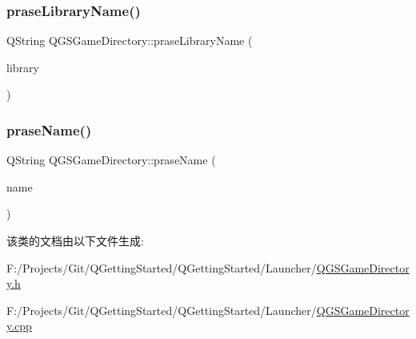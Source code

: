 \mbox{\label{class_q_g_s_game_directory_a862cadde0ec810cb444346fcf2f75da4}} 
\subsubsection{\texorpdfstring{prase\+Library\+Name()}{praseLibraryName()}}
{\footnotesize\ttfamily Q\+String Q\+G\+S\+Game\+Directory\+::prase\+Library\+Name (\begin{DoxyParamCaption}\item[{const \mbox{\hyperlink{class_q_g_s_library}{Q\+G\+S\+Library}} \&}]{library }\end{DoxyParamCaption})\hspace{0.3cm}{\ttfamily [static]}}

\mbox{\label{class_q_g_s_game_directory_a05d4f173c565e05d9f271a31ea6a82e6}} 
\subsubsection{\texorpdfstring{prase\+Name()}{praseName()}}
{\footnotesize\ttfamily Q\+String Q\+G\+S\+Game\+Directory\+::prase\+Name (\begin{DoxyParamCaption}\item[{const Q\+String \&}]{name }\end{DoxyParamCaption})\hspace{0.3cm}{\ttfamily [static]}}



该类的文档由以下文件生成\+:\begin{DoxyCompactItemize}
\item 
F\+:/\+Projects/\+Git/\+Q\+Getting\+Started/\+Q\+Getting\+Started/\+Launcher/\mbox{\hyperlink{_q_g_s_game_directory_8h}{Q\+G\+S\+Game\+Directory.\+h}}\item 
F\+:/\+Projects/\+Git/\+Q\+Getting\+Started/\+Q\+Getting\+Started/\+Launcher/\mbox{\hyperlink{_q_g_s_game_directory_8cpp}{Q\+G\+S\+Game\+Directory.\+cpp}}\end{DoxyCompactItemize}
